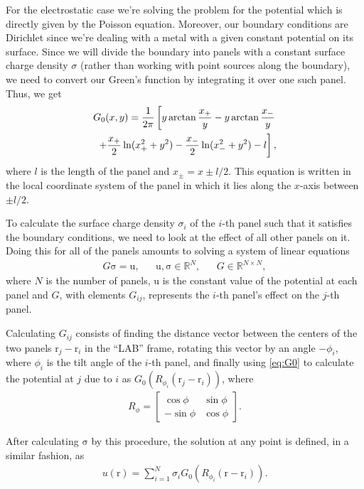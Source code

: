 \documentclass[10pt,a4paper,twocolumn]{article}
\renewcommand{\vec}[1]{\bm{\mathrm{#1}}}
\begin{document}
For the electrostatic case we're solving the problem for the potential which is directly given by the Poisson equation. Moreover, our boundary conditions are Dirichlet since we're dealing with a metal with a given constant potential on its surface. Since we will divide the boundary into panels with a constant surface charge density $\sigma$ (rather than working with point sources along the boundary), we need to convert our Green's function by integrating it over one such panel. Thus, we get
%
\begin{align}\label{eq:G0}
    G_0(x, y) = \frac{1}{2 \pi} \left[ y \arctan\frac{x_+}{y} - y \arctan\frac{x_-}{y} \right. \notag\\
    \left. + \frac{x_+}{2} \ln (x_+^2 + y^2) - \frac{x_-}{2} \ln (x_-^2 + y^2) - l\right],
\end{align}
%
where $l$ is the length of the panel and $x_{\pm} = x \pm l/2$. This equation is written in the local coordinate system of the panel in which it lies along the $x$-axis between $\pm l/2$.

To calculate the surface charge density $\sigma_i$ of the $i$-th panel such that it satisfies the boundary conditions, we need to look at the effect of all other panels on it. Doing this for all of the panels amounts to solving a system of linear equations
%
\begin{align}
    &G \vec{\sigma} = \vec{u},& &\vec{u},\vec{\sigma} \in \mathbb{R}^{N},& &G \in \mathbb{R}^{N \times N},&
\end{align}
%
where $N$ is the number of panels, $\vec{u}$ is the constant value of the potential at each panel and $G$, with elements $G_{ij}$, represents the $i$-th panel's effect on the $j$-th panel.

Calculating $G_{ij}$ consists of finding the distance vector between the centers of the two panels $\vec{r}_j - \vec{r}_i$ in the ``LAB'' frame, rotating this vector by an angle $-\phi_i$, where $\phi_i$ is the tilt angle of the $i$-th panel, and finally using \cref{eq:G0} to calculate the potential at $j$ due to $i$ as $G_0\left(R_{\phi_i}(\vec{r}_j - \vec{r}_i)\right)$, where
%
\begin{align}
    R_{\phi} = \begin{bmatrix}
        \cos \phi & \sin \phi \\
        -\sin \phi & \cos \phi
    \end{bmatrix}.
\end{align}

After calculating $\vec{\sigma}$ by this procedure, the solution at any point is defined, in a similar fashion, as
%
\begin{align}
    u(\vec{r}) = \sum_{i=1}^{N} \sigma_i G_0\left(R_{\phi_i}(\vec{r} - \vec{r}_i)\right).
\end{align}
\end{document}
